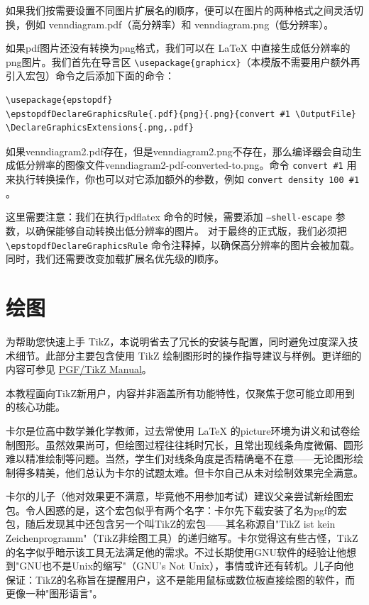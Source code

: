 如果我们按需要设置不同图片扩展名的顺序，便可以在图片的两种格式之间灵活切换，例如 venndiagram.pdf（高分辨率）和 venndiagram.png（低分辨率）。



如果pdf图片还没有转换为png格式，我们可以在 \LaTeX{} 中直接生成低分辨率的png图片。我们首先在导言区 \verb|\usepackage{graphicx}|（本模版不需要用户额外再引入宏包）命令之后添加下面的命令：
\begin{verbatim}
\usepackage{epstopdf}
\epstopdfDeclareGraphicsRule{.pdf}{png}{.png}{convert #1 \OutputFile}
\DeclareGraphicsExtensions{.png,.pdf}
\end{verbatim}
如果venndiagram2.pdf存在，但是venndiagram2.png不存在，那么编译器会自动生成低分辨率的图像文件venndiagram2-pdf-converted-to.png。命令 \texttt{convert \#1} 用来执行转换操作，你也可以对它添加额外的参数，例如 \texttt{convert \-density 100 \#1} 。

这里需要注意：我们在执行pdflatex 命令的时候，需要添加 \texttt{--shell-escape} 参数，以确保能够自动转换出低分辨率的图片。
对于最终的正式版，我们必须把 \verb|\epstopdfDeclareGraphicsRule| 命令注释掉，以确保高分辨率的图片会被加载。同时，我们还需要改变加载扩展名优先级的顺序。


\section{绘图}
为帮助您快速上手 TikZ，本说明省去了冗长的安装与配置，同时避免过度深入技术细节。此部分主要包含使用 TikZ 绘制图形时的操作指导建议与样例。更详细的内容可参见 \href{https://tikz.dev/tutorials-guidelines}{PGF/TikZ Manual}。

本教程面向TikZ新用户，内容并非涵盖所有功能特性，仅聚焦于您可能立即用到的核心功能。

卡尔是位高中数学兼化学教师，过去常使用 \LaTeX{} 的picture环境为讲义和试卷绘制图形。虽然效果尚可，但绘图过程往往耗时冗长，且常出现线条角度微偏、圆形难以精准绘制等问题。当然，学生们对线条角度是否精确毫不在意——无论图形绘制得多精美，他们总认为卡尔的试题太难。但卡尔自己从未对绘制效果完全满意。

卡尔的儿子（他对效果更不满意，毕竟他不用参加考试）建议父亲尝试新绘图宏包。令人困惑的是，这个宏包似乎有两个名字：卡尔先下载安装了名为pgf的宏包，随后发现其中还包含另一个叫TikZ的宏包——其名称源自"TikZ ist kein Zeichenprogramm"（TikZ非绘图工具）的递归缩写。卡尔觉得这有些古怪，TikZ的名字似乎暗示该工具无法满足他的需求。不过长期使用GNU软件的经验让他想到"GNU也不是Unix的缩写"（GNU's Not Unix），事情或许还有转机。儿子向他保证：TikZ的名称旨在提醒用户，这不是能用鼠标或数位板直接绘图的软件，而更像一种"图形语言"。

